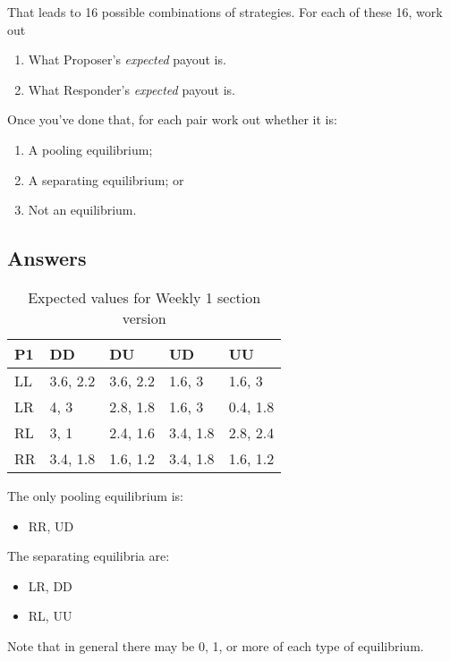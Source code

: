 \documentclass[
  12pt,
  letterpaper,
  DIV=11,
  numbers=noendperiod]{scrartcl}
\providecommand{\tightlist}{%
  \setlength{\itemsep}{0pt}\setlength{\parskip}{0pt}}\usepackage{longtable,booktabs,array}
\begin{document}
That leads to 16 possible combinations of strategies. For each of these
16, work out

\begin{enumerate}
\def\labelenumi{\Alph{enumi}.}
\tightlist
\item
  What Proposer's \emph{expected} payout is.
\item
  What Responder's \emph{expected} payout is.
\end{enumerate}

Once you've done that, for each pair work out whether it is:

\begin{enumerate}
\def\labelenumi{\Alph{enumi}.}
\tightlist
\item
  A pooling equilibrium;
\item
  A separating equilibrium; or
\item
  Not an equilibrium.
\end{enumerate}

\subsection{Answers}\label{answers}

\begin{longtable}[]{@{}lllll@{}}

\caption{\label{tbl-main-tree}Expected values for Weekly 1 section
version}

\tabularnewline

\toprule\noalign{}
P1 & DD & DU & UD & UU \\
\midrule\noalign{}
\endhead
\bottomrule\noalign{}
\endlastfoot
LL & 3.6, 2.2 & 3.6, 2.2 & 1.6, 3 & 1.6, 3 \\
LR & 4, 3 & 2.8, 1.8 & 1.6, 3 & 0.4, 1.8 \\
RL & 3, 1 & 2.4, 1.6 & 3.4, 1.8 & 2.8, 2.4 \\
RR & 3.4, 1.8 & 1.6, 1.2 & 3.4, 1.8 & 1.6, 1.2 \\

\end{longtable}

The only pooling equilibrium is:

\begin{itemize}
\tightlist
\item
  RR, UD
\end{itemize}

The separating equilibria are:

\begin{itemize}
\tightlist
\item
  LR, DD
\item
  RL, UU
\end{itemize}

Note that in general there may be 0, 1, or more of each type of
equilibrium.
\end{document}
